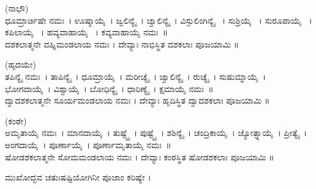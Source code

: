 (ನಾಭೌ)\\
ಧೂಮ್ರಾರ್ಚಿಷೇ   ನಮಃ~। ಊಷ್ಮಾಯೈ~। ಜ್ವಲಿನ್ಯೈ~। ಜ್ವಾಲಿನ್ಯೈ~। ವಿಸ್ಫುಲಿಂಗಿನ್ಯೈ ~। ಸುಶ್ರಿಯೈ ~। ಸುರೂಪಾಯೈ ~। ಕಪಿಲಾಯೈ ~। ಹವ್ಯವಾಹಾಯೈ ~। ಕವ್ಯವಾಹಾಯೈ ನಮಃ~॥\\
ದಶಕಲಾತ್ಮನೇ ವಹ್ನಿಮಂಡಲಾಯ ನಮಃ । ದೇವ್ಯಾಃ ನಾಭಿಸ್ಥಿತ ದಶಕಲಾಃ ಪೂಜಯಾಮಿ ॥

(ಹೃದಯೇ)\\
ತಪಿನ್ಯೈ ನಮಃ~। ತಾಪಿನ್ಯೈ~। ಧೂಮ್ರಾಯೈ~। ಮರೀಚ್ಯೈ~। ಜ್ವಾಲಿನ್ಯೈ~। ರುಚ್ಯೈ~। ಸುಷುಮ್ನಾಯೈ~। ಭೋಗದಾಯೈ~। ವಿಶ್ವಾಯೈ~। ಬೋಧಿನ್ಯೈ~। ಧಾರಿಣ್ಯೈ~। ಕ್ಷಮಾಯೈ ನಮಃ~॥\\
ದ್ವಾದಶಕಲಾತ್ಮನೇ ಸೂರ್ಯಮಂಡಲಾಯ ನಮಃ । ದೇವ್ಯಾಃ ಹೃದಿಸ್ಥಿತ ದ್ವಾದಶಕಲಾಃ ಪೂಜಯಾಮಿ ॥

(ಕಂಠೇ)\\
ಅಮೃತಾಯೈ ನಮಃ~। ಮಾನದಾಯೈ~। ತುಷ್ಟ್ಯೈ~। ಪುಷ್ಟ್ಯೈ~। ಶಶಿನ್ಯೈ~। ಚಂದ್ರಿಕಾಯೈ~। ಜ್ಯೋತ್ಸ್ನಾಯೈ~। ಪ್ರೀತ್ಯೈ~। ಅಂಗದಾಯೈ~। ಪೂರ್ಣಾಯೈ~। ಪೂರ್ಣಾಮೃತಾಯೈ ನಮಃ~॥\\
ಷೋಡಶಕಲಾತ್ಮನೇ ಸೋಮಮಂಡಲಾಯ ನಮಃ । ದೇವ್ಯಾಃ ಕಂಠಸ್ಥಿತ ಷೋಡಶಕಲಾಃ ಪೂಜಯಾಮಿ ॥

ಮುಖೋದ್ಭವ ಚತುಃಷಷ್ಟಿಯೋಗಿನೀ ಪೂಜಾಂ ಕರಿಷ್ಯೇ ।
